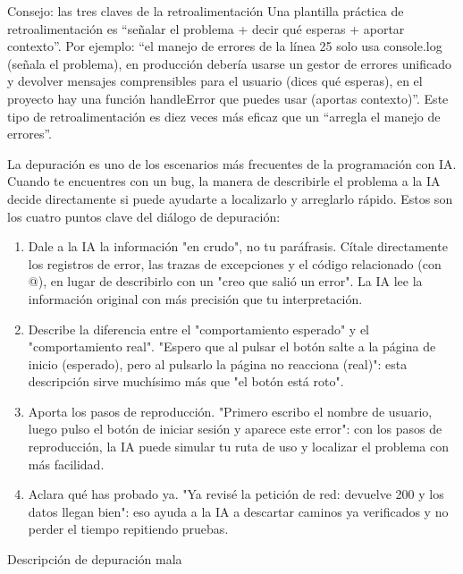 \begin{tcbinfo}{Consejo: las tres claves de la retroalimentación}
Una plantilla práctica de retroalimentación es “señalar el problema + decir qué esperas + aportar contexto”. Por ejemplo: “el manejo de errores de la línea 25 solo usa console.log (señala el problema), en producción debería usarse un gestor de errores unificado y devolver mensajes comprensibles para el usuario (dices qué esperas), en el proyecto hay una función handleError que puedes usar (aportas contexto)”. Este tipo de retroalimentación es diez veces más eficaz que un “arregla el manejo de errores”.

\end{tcbinfo}


La depuración es uno de los escenarios más frecuentes de la programación con IA. Cuando te encuentres con un bug, la manera de describirle el problema a la IA decide directamente si puede ayudarte a localizarlo y arreglarlo rápido. Estos son los cuatro puntos clave del diálogo de depuración:

\begin{enumerate}
  \item Dale a la IA la información "en crudo", no tu paráfrasis. Cítale directamente los registros de error, las trazas de excepciones y el código relacionado (con @), en lugar de describirlo con un "creo que salió un error". La IA lee la información original con más precisión que tu interpretación.
  \item Describe la diferencia entre el "comportamiento esperado" y el "comportamiento real". "Espero que al pulsar el botón salte a la página de inicio (esperado), pero al pulsarlo la página no reacciona (real)": esta descripción sirve muchísimo más que "el botón está roto".
  \item Aporta los pasos de reproducción. "Primero escribo el nombre de usuario, luego pulso el botón de iniciar sesión y aparece este error": con los pasos de reproducción, la IA puede simular tu ruta de uso y localizar el problema con más facilidad.
  \item Aclara qué has probado ya. "Ya revisé la petición de red: devuelve 200 y los datos llegan bien": eso ayuda a la IA a descartar caminos ya verificados y no perder el tiempo repitiendo pruebas.
\end{enumerate}

Descripción de depuración mala

